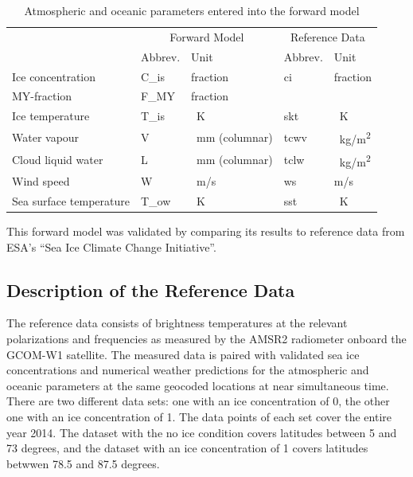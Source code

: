 \documentclass[11pt, a4paper]{article}
\begin{document}
\begin{table}[h!]
\centering
\begin{tabular}{@{}p{4cm} p{1.8cm}p{2.8cm}p{1.8cm}p{1.8cm}@{}}
\tabularnewline
& \multicolumn{2}{c}{Forward Model} & \multicolumn{2}{c}{Reference Data}
\tabularnewline
\cmidrule(r{1em}){2-3} \cmidrule(l{1em}){4-5}
& Abbrev. & Unit & Abbrev. & Unit
\tabularnewline
\midrule
Ice concentration	& C\_is	& fraction		& ci	& fraction	\\
MY-fraction		& F\_MY	& fraction		& 	& 		\\
Ice temperature		& T\_is	& \SI{}{K}	& skt	& \SI{}{K}	\\
Water vapour		& V	& \SI{}{mm} (columnar)	& tcwv	& \SI{}{kg/m^2}	\\
Cloud liquid water	& L	& \SI{}{mm} (columnar)	& tclw	& \SI{}{kg/m^2}	\\
Wind speed		& W	& \SI{}{m/s}		& ws	& m/s		\\
Sea surface temperature	& T\_ow	& \SI{}{K}	& sst	& \SI{}{K}	\\
\midrule
\end{tabular}
\caption{Atmospheric and oceanic parameters entered into the forward model}
\label{tab:input_parameters}
\end{table}

This forward model was validated by comparing its results to reference data from ESA's ``Sea Ice Climate Change Initiative''.



\subsection{Description of the Reference Data}
\label{sec:RefDat}

The reference data consists of brightness temperatures at the relevant polarizations and frequencies as measured by the AMSR2 radiometer onboard the GCOM-W1 satellite. %
The measured data is paired with validated sea ice concentrations and numerical weather predictions for the atmospheric and oceanic parameters at the same geocoded locations at near simultaneous time. There are two different data sets: one with an ice concentration of 0, the other one with an ice concentration of 1. The data points of each set cover the entire year 2014. The dataset with the no ice condition covers latitudes between 5 and 73 degrees, and the dataset with an ice concentration of 1 covers latitudes betwwen 78.5 and 87.5 degrees. 
\newline
\end{document}
